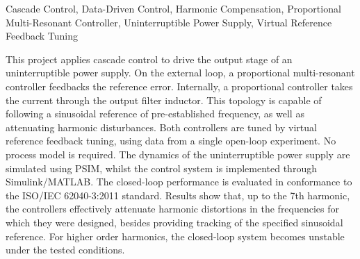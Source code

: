 \documentclass[repeatfields,oneside]{tcc}
\begin{document}
\begin{englishabstract}{Cascade Control, Data-Driven Control, Harmonic Compensation, Proportional Multi-Resonant Controller, Uninterruptible Power Supply, Virtual Reference Feedback Tuning}

\noindent
This project applies cascade control to drive the output stage of an uninterruptible power supply.
On the external loop, a proportional multi-resonant controller feedbacks the reference error.
Internally, a proportional controller takes the current through the output filter inductor.
This topology is capable of following a sinusoidal reference of pre-established frequency, as well as attenuating harmonic disturbances.
Both controllers are tuned by virtual reference feedback tuning, using data from a single open-loop experiment.
No process model is required.
The dynamics of the uninterruptible power supply are simulated using PSIM, whilst the control system is implemented through Simulink\slash{}MATLAB.
The closed-loop performance is evaluated in conformance to the ISO\slash{}IEC 62040-3:2011 standard.
Results show that, up to the 7th harmonic, the controllers effectively attenuate harmonic distortions in the frequencies for which they were designed, besides providing tracking of the specified sinusoidal reference.
For higher order harmonics, the closed-loop system becomes unstable under the tested conditions.

\end{englishabstract}




\listoffigures

\listoftables

\end{document}
